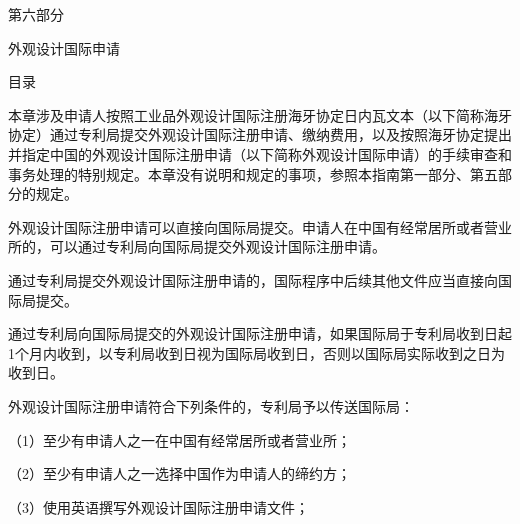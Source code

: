 \cleardoublepage{}\resetchapters
\thispagestyle{plainempty}\hypertarget{gpos.p6}{}\begingroup\centering\guidecenterpage
\dadati\fontsize{29.04bp}{43bp}\selectfont
\vspace*{242bp}
第六部分\par
外观设计国际申请\par
{}
{}
\endgroup\clearpage
\cleardoublepage\pagestyle{tocpage}
\gdef\guidetabcontent{\hbox{第}\hbox{六}\hbox{部}\hbox{分}}
{\centering\guidecenterpage\heiti\fontsize{14.04bp}{21bp}\selectfont 目\quad 录\par}
\vspace{6bp}
\clearpage\pagestyle{main}
本章涉及申请人按照工业品外观设计国际注册海牙协定日内瓦文本（以下简称海牙协定）通过专利局提交外观设计国际注册申请、缴纳费用，以及按照海牙协定提出并指定中国的外观设计国际注册申请（以下简称外观设计国际申请）的手续审查和事务处理的特别规定。本章没有说明和规定的事项，参照本指南第一部分、第五部分的规定。

外观设计国际注册申请可以直接向国际局提交。申请人在中国有经常居所或者营业所的，可以通过专利局向国际局提交外观设计国际注册申请。

通过专利局提交外观设计国际注册申请的，国际程序中后续其他文件应当直接向国际局提交。

通过专利局向国际局提交的外观设计国际注册申请，如果国际局于专利局收到日起1个月内收到，以专利局收到日视为国际局收到日，否则以国际局实际收到之日为收到日。

外观设计国际注册申请符合下列条件的，专利局予以传送国际局：

{\setlength{\parindent}{17.1bp}（1）至少有申请人之一在中国有经常居所或者营业所；\par}

{\setlength{\parindent}{17.1bp}（2）至少有申请人之一选择中国作为申请人的缔约方；\par}

{\setlength{\parindent}{17.1bp}（3）使用英语撰写外观设计国际注册申请文件；\par}

